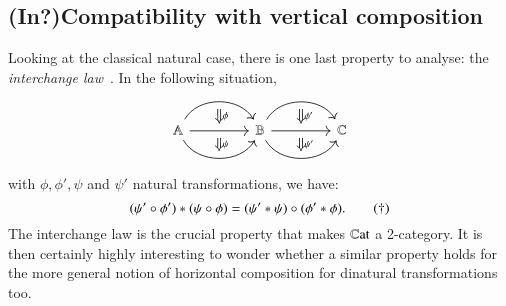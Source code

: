 \subsection{(In?)Compatibility with vertical composition}\label{section compatibility}

Looking at the classical natural case, there is one last property to analyse: the \emph{interchange law}~\cite{mac_lane_categories_1978}. In the following situation,
\[
\begin{tikzcd}[column sep=1.5cm]
\A \arrow[r, out=60, in=120, ""{name=U, below}]
\arrow[r, ""{name=D, }]
\arrow[r,phantom,""{name=D1,below}]
\arrow[r, bend right=60,""{name=V,above}]
& \B \arrow[r, bend left=60, ""{name=H, below}]
\arrow[r,""{name=E}]
\arrow[r,phantom,""{name=E1,below}]
\arrow[r, bend right=60,""{name=K,above}]
& \C
\arrow[Rightarrow, from=U, to=D,"\phi"]
\arrow[Rightarrow, from=D1, to=V,"\psi"]
\arrow[Rightarrow, from=H, to=E, "\phi'"]
\arrow[Rightarrow, from=E1,to=K, "\psi'"]
\end{tikzcd}
\]
with $\phi,\phi',\psi$ and $\psi'$ natural transformations, we have:
\begin{equation}\label{interchange law}
\hc {(\psi \circ \phi)} {(\psi' \circ \phi')} = (\hc \psi {\psi'}) \circ (\hc \phi {\phi'}). \tag{$\dagger$}
\end{equation}
The interchange law is the crucial property that makes $\mathbb C\mathrm{at}$ a 2-category. It is then certainly highly interesting to wonder whether a similar property holds for the more general notion of horizontal composition for dinatural transformations too.


